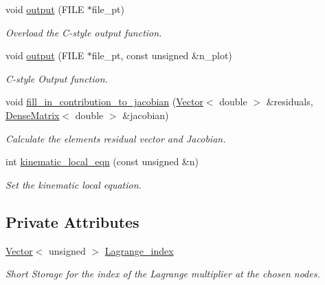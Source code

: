 \begin{DoxyCompactItemize}
void \hyperlink{classoomph_1_1ElasticPointFluidInterfaceBoundingElement_a61782633205934c9af1aead51640e220}{output} (F\+I\+LE $\ast$file\+\_\+pt)
\begin{DoxyCompactList}\small\item\em Overload the C-\/style output function. \end{DoxyCompactList}\item 
void \hyperlink{classoomph_1_1ElasticPointFluidInterfaceBoundingElement_a4b30d56cc1869b5c9c4819843fb65ecc}{output} (F\+I\+LE $\ast$file\+\_\+pt, const unsigned \&n\+\_\+plot)
\begin{DoxyCompactList}\small\item\em C-\/style Output function. \end{DoxyCompactList}\item 
void \hyperlink{classoomph_1_1ElasticPointFluidInterfaceBoundingElement_a87802dab899430374a926d1e1bf3d90b}{fill\+\_\+in\+\_\+contribution\+\_\+to\+\_\+jacobian} (\hyperlink{classoomph_1_1Vector}{Vector}$<$ double $>$ \&residuals, \hyperlink{classoomph_1_1DenseMatrix}{Dense\+Matrix}$<$ double $>$ \&jacobian)
\begin{DoxyCompactList}\small\item\em Calculate the element\textquotesingle{}s residual vector and Jacobian. \end{DoxyCompactList}\item 
int \hyperlink{classoomph_1_1ElasticPointFluidInterfaceBoundingElement_ac3d7ce3db705bee219bf56cbb0d9ba92}{kinematic\+\_\+local\+\_\+eqn} (const unsigned \&n)
\begin{DoxyCompactList}\small\item\em Set the kinematic local equation. \end{DoxyCompactList}\end{DoxyCompactItemize}
\subsection*{Private Attributes}
\begin{DoxyCompactItemize}
\item 
\hyperlink{classoomph_1_1Vector}{Vector}$<$ unsigned $>$ \hyperlink{classoomph_1_1ElasticPointFluidInterfaceBoundingElement_a6ba345f9959aa12708c3ef8598327bc2}{Lagrange\+\_\+index}
\begin{DoxyCompactList}\small\item\em Short Storage for the index of the Lagrange multiplier at the chosen nodes. \end{DoxyCompactList}\end{DoxyCompactItemize}
